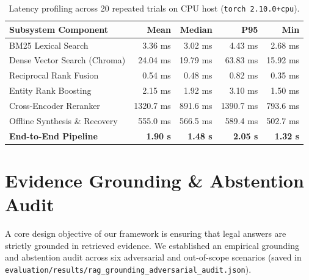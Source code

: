 \documentclass[10pt,twocolumn]{article}
\begin{document}
\begin{table}[t]
\centering
\small
\caption{Latency profiling across 20 repeated trials on CPU host (\texttt{torch 2.10.0+cpu}).}
\begin{tabularx}{\columnwidth}{lrrrr}
\toprule
\textbf{Subsystem Component} & \textbf{Mean} & \textbf{Median} & \textbf{P95} & \textbf{Min} \\
\midrule
BM25 Lexical Search        & 3.36 ms   & 3.02 ms   & 4.43 ms   & 2.68 ms \\
Dense Vector Search (Chroma)& 24.04 ms  & 19.79 ms  & 63.83 ms  & 15.92 ms \\
Reciprocal Rank Fusion     & 0.54 ms   & 0.48 ms   & 0.82 ms   & 0.35 ms \\
Entity Rank Boosting       & 2.15 ms   & 1.92 ms   & 3.10 ms   & 1.50 ms \\
Cross-Encoder Reranker     & 1320.7 ms & 891.6 ms  & 1390.7 ms & 793.6 ms \\
Offline Synthesis \& Recovery & 555.0 ms & 566.5 ms & 589.4 ms  & 502.7 ms \\
\midrule
\textbf{End-to-End Pipeline} & \textbf{1.90 s} & \textbf{1.48 s} & \textbf{2.05 s} & \textbf{1.32 s} \\
\bottomrule
\end{tabularx}
\label{tab:latency}
\end{table}

\section{Evidence Grounding \& Abstention Audit}
\label{sec:grounding}

A core design objective of our framework is ensuring that legal answers are strictly grounded in retrieved evidence. We established an empirical grounding and abstention audit across six adversarial and out-of-scope scenarios (saved in \texttt{evaluation/results/rag\_grounding\_adversarial\_audit.json}).
\end{document}
